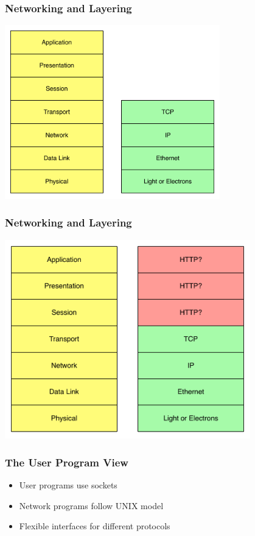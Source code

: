 \documentclass[pdftex]{beamer} %
\begin{document}
\begin{frame}
  \frametitle{Networking and Layering}
\centering
\includegraphics[width=0.7\textwidth]{../../figures/ISO-layers-mapped.pdf}
\end{frame}

\begin{frame}
  \frametitle{Networking and Layering}
\centering
\includegraphics[width=0.8\textwidth]{../../figures/ISO-layers-http.pdf}
\end{frame}

\begin{frame}
  \frametitle{The User Program View}
  \begin{itemize}
  \item User programs use sockets
  \item Network programs follow UNIX model
  \item Flexible interfaces for different protocols
  \end{itemize}
\end{frame}
\end{document}
